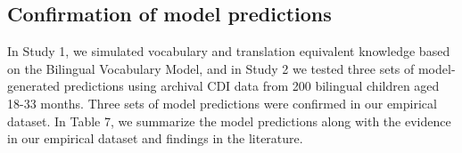 \documentclass[
  english,
  ,man,floatsintext]{apa6}
\begin{document}
\hypertarget{confirmation-of-model-predictions}{%
\subsection{Confirmation of model predictions}\label{confirmation-of-model-predictions}}

In Study 1, we simulated vocabulary and translation equivalent knowledge based on the Bilingual Vocabulary Model, and in Study 2 we tested three sets of model-generated predictions using archival CDI data from 200 bilingual children aged 18-33 months. Three sets of model predictions were confirmed in our empirical dataset. In Table 7, we summarize the model predictions along with the evidence in our empirical dataset and findings in the literature.

\begin{landscape}\begin{table}


\end{table}
\end{landscape}
\end{document}
